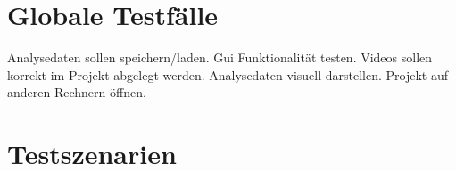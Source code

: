 \chapter{Globale Testfälle}
\setcounter{enumi}{0}
 Analysedaten sollen speichern/laden.
 Gui Funktionalität testen.
 Videos sollen korrekt im Projekt abgelegt werden.
 Analysedaten visuell darstellen.
 Projekt auf anderen Rechnern öffnen.
\chapter{Testszenarien}